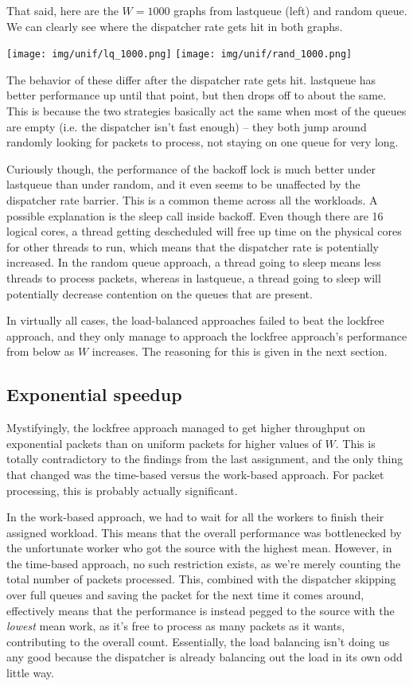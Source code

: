\documentclass{article}
\begin{document}
That said, here are the $W=1000$ graphs from lastqueue (left) and random queue. We can clearly see where the dispatcher rate gets hit in both graphs.

\texttt{[image: img/unif/lq\_1000.png]}
\texttt{[image: img/unif/rand\_1000.png]}

The behavior of these differ after the dispatcher rate gets hit. lastqueue has better performance up until that point, but then drops off to about the same. This is because the two strategies basically act the same when most of the queues are empty (i.e. the dispatcher isn't fast enough) -- they both jump around randomly looking for packets to process, not staying on one queue for very long. 

Curiously though, the performance of the backoff lock is much better under lastqueue than under random, and it even seems to be unaffected by the dispatcher rate barrier. This is a common theme across all the workloads. A possible explanation is the sleep call inside backoff. Even though there are 16 logical cores, a thread getting descheduled will free up time on the physical cores for other threads to run, which means that the dispatcher rate is potentially increased. In the random queue approach, a thread going to sleep means less threads to process packets, whereas in lastqueue, a thread going to sleep will potentially decrease contention on the queues that are present.

In virtually all cases, the load-balanced approaches failed to beat the lockfree approach, and they only manage to approach the lockfree approach's performance from below as $W$ increases. The reasoning for this is given in the next section.

\subsection*{Exponential speedup}
Mystifyingly, the lockfree approach managed to get higher throughput on exponential packets than on uniform packets for higher values of $W$. This is totally contradictory to the findings from the last assignment, and the only thing that changed was the time-based versus the work-based approach. For packet processing, this is probably actually significant. 

In the work-based approach, we had to wait for all the workers to finish their assigned workload. This means that the overall performance was bottlenecked by the unfortunate worker who got the source with the highest mean. However, in the time-based approach, no such restriction exists, as we're merely counting the total number of packets processed. This, combined with the dispatcher skipping over full queues and saving the packet for the next time it comes around, effectively means that the performance is instead pegged to the source with the \textit{lowest} mean work, as it's free to process as many packets as it wants, contributing to the overall count. Essentially, the load balancing isn't doing us any good because the dispatcher is already balancing out the load in its own odd little way.
\end{document}
